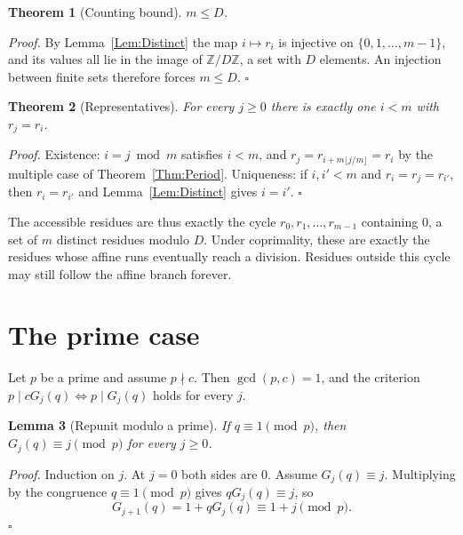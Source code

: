 \documentclass[11pt,letterpaper]{article}
\newtheorem{theorem}{Theorem}
\newtheorem{lemma}[theorem]{Lemma}
\newenvironment{proof}{\noindent\textit{Proof.}}{\hfill\(\square\)}
\begin{document}
\begin{theorem}[Counting bound]\label{Thm:Counting}
\(m\le D\).
\end{theorem}

\begin{proof}
By Lemma~\ref{Lem:Distinct} the map \(i\mapsto r_i\) is injective on
\(\{0,1,\dots,m-1\}\), and its values all lie in the image of
\(\mathbb{Z}/D\mathbb{Z}\), a set with \(D\) elements. An injection between
finite sets therefore forces \(m\le D\).
\end{proof}

\begin{theorem}[Representatives]\label{Thm:Representatives}
For every \(j\ge0\) there is exactly one \(i<m\) with \(r_j=r_i\).
\end{theorem}

\begin{proof}
Existence: \(i=j\bmod m\) satisfies \(i<m\), and \(r_j=r_{i+m\lfloor
j/m\rfloor}=r_i\) by the multiple case of Theorem~\ref{Thm:Period}.
Uniqueness: if \(i,i'<m\) and \(r_i=r_j=r_{i'}\), then \(r_i=r_{i'}\) and
Lemma~\ref{Lem:Distinct} gives \(i=i'\).
\end{proof}

The accessible residues are thus exactly the cycle
\(r_0,r_1,\dots,r_{m-1}\) containing \(0\), a set of \(m\) distinct residues
modulo \(D\). Under coprimality, these are exactly the residues whose
affine runs eventually reach a division. Residues outside this cycle may
still follow the affine branch forever.

\section{The prime case}

Let \(p\) be a prime and assume \(p\nmid c\). Then \(\gcd(p,c)=1\), and the
criterion \(p\mid cG_j(q)\iff p\mid G_j(q)\) holds for every \(j\).

\begin{lemma}[Repunit modulo a prime]\label{Lem:RepunitPrime}
If \(q\equiv1\pmod p\), then \(G_j(q)\equiv j\pmod p\) for every \(j\ge0\).
\end{lemma}

\begin{proof}
Induction on \(j\). At \(j=0\) both sides are \(0\). Assume
\(G_j(q)\equiv j\). Multiplying by the congruence \(q\equiv1\pmod p\) gives
\(qG_j(q)\equiv j\), so
\[
G_{j+1}(q)=1+qG_j(q)\equiv 1+j\pmod p .
\]
\end{proof}
\end{document}
